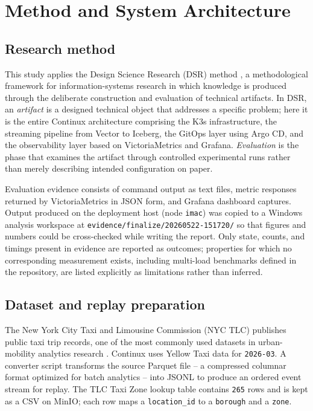 \section{Method and System Architecture}\label{sec:method}

\subsection{Research method}
This study applies the Design Science Research (DSR) method \parencite{hevner2004design}, a methodological framework for information-systems research in which knowledge is produced through the deliberate construction and evaluation of technical artifacts. In DSR, an \emph{artifact} is a designed technical object that addresses a specific problem; here it is the entire Continux architecture comprising the K3s infrastructure, the streaming pipeline from Vector to Iceberg, the GitOps layer using Argo CD, and the observability layer based on VictoriaMetrics and Grafana. \emph{Evaluation} is the phase that examines the artifact through controlled experimental runs rather than merely describing intended configuration on paper.

Evaluation evidence consists of command output as text files, metric responses returned by VictoriaMetrics in JSON form, and Grafana dashboard captures. Output produced on the deployment host (node \texttt{imac}) was copied to a Windows analysis workspace at \texttt{evidence/finalize/\hspace{0pt}20260522-151720/} so that figures and numbers could be cross-checked while writing the report. Only state, counts, and timings present in evidence are reported as outcomes; properties for which no corresponding measurement exists, including multi-load benchmarks defined in the repository, are listed explicitly as limitations rather than inferred.

\subsection{Dataset and replay preparation}
The New York City Taxi and Limousine Commission (NYC TLC) publishes public taxi trip records, one of the most commonly used datasets in urban-mobility analytics research \parencite{nyctlc}. Continux uses Yellow Taxi data for \texttt{2026-03}. A converter script transforms the source Parquet file -- a compressed columnar format optimized for batch analytics -- into JSONL to produce an ordered event stream for replay. The TLC Taxi Zone lookup table contains \texttt{265} rows and is kept as a CSV on MinIO; each row maps a \texttt{location\_id} to a \texttt{borough} and a \texttt{zone}.

